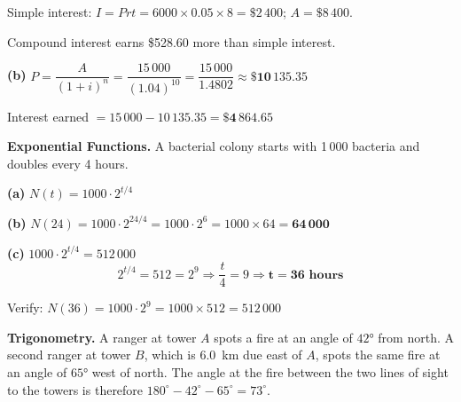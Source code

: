 \documentclass[addpoints]{exam}
\begin{document}
\begin{questions}
\begin{solution}[10cm]
Simple interest: $I = Prt = 6000 \times 0.05 \times 8 = \$2\,400$; $A = \$8\,400$.

Compound interest earns \$528.60 more than simple interest.

\textbf{(b)} $P = \dfrac{A}{(1+i)^n} = \dfrac{15\,000}{(1.04)^{10}} = \dfrac{15\,000}{1.4802} \approx \mathbf{\$10\,135.35}$

Interest earned $= 15\,000 - 10\,135.35 = \mathbf{\$4\,864.65}$
\end{solution}

\question[8] \textbf{Exponential Functions.}
A bacterial colony starts with 1\,000 bacteria and doubles every 4 hours.
\begin{solution}[9cm]
\textbf{(a)} $N(t) = 1000 \cdot 2^{t/4}$

\textbf{(b)} $N(24) = 1000 \cdot 2^{24/4} = 1000 \cdot 2^6 = 1000 \times 64 = \mathbf{64\,000}$

\textbf{(c)} $1000 \cdot 2^{t/4} = 512\,000$
\[2^{t/4} = 512 = 2^9 \Rightarrow \frac{t}{4} = 9 \Rightarrow \mathbf{t = 36 \text{ hours}}\]

Verify: $N(36) = 1000 \cdot 2^9 = 1000 \times 512 = 512\,000$ \checkmark
\end{solution}

\question[8] \textbf{Trigonometry.}
A ranger at tower $A$ spots a fire at an angle of $\ang{42}$ from north. A second ranger at tower $B$,
which is \SI{6.0}{km} due east of $A$, spots the same fire at an angle of $\ang{65}$ west of north.
The angle at the fire between the two lines of sight to the towers is therefore
$180^\circ - 42^\circ - 65^\circ = 73^\circ$.
\end{questions}
\end{document}
